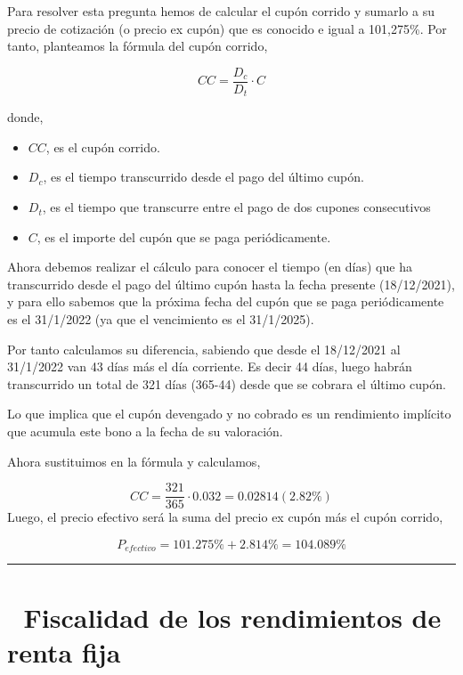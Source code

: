 \documentclass[
  letterpaper,
  DIV=11,
  numbers=noendperiod]{scrreprt}
\begin{document}
\begin{tcolorbox}
\begin{tcolorbox}[enhanced jigsaw, toprule=.15mm, left=2mm, arc=.35mm, breakable, bottomrule=.15mm, opacityback=0, rightrule=.15mm, leftrule=.75mm, colframe=quarto-callout-note-color-frame, colback=white]
\begin{minipage}[t]{\textwidth - 5.5mm}
Para resolver esta pregunta hemos de calcular el cupón corrido y sumarlo
a su precio de cotización (o precio ex cupón) que es conocido e igual a
101,275\%. Por tanto, planteamos la fórmula del cupón corrido,

\[CC=\frac{D_c}{D_t}\cdot C\]

donde,

\begin{itemize}
\item
  \(CC\), es el cupón corrido.
\item
  \(D_{c}\), es el tiempo transcurrido desde el pago del último cupón.
\item
  \(D_{t}\), es el tiempo que transcurre entre el pago de dos cupones
  consecutivos
\item
  \(C\), es el importe del cupón que se paga periódicamente.
\end{itemize}

Ahora debemos realizar el cálculo para conocer el tiempo (en días) que
ha transcurrido desde el pago del último cupón hasta la fecha presente
(18/12/2021), y para ello sabemos que la próxima fecha del cupón que se
paga periódicamente es el 31/1/2022 (ya que el vencimiento es el
31/1/2025).

Por tanto calculamos su diferencia, sabiendo que desde el 18/12/2021 al
31/1/2022 van 43 días más el día corriente. Es decir 44 días, luego
habrán transcurrido un total de 321 días (365-44) desde que se cobrara
el último cupón.

Lo que implica que el cupón devengado y no cobrado es un rendimiento
implícito que acumula este bono a la fecha de su valoración.

Ahora sustituimos en la fórmula y calculamos,

\[CC=\frac{321}{365}\cdot 0.032=0.02814(2.82\%)\] Luego, el precio
efectivo será la suma del precio ex cupón más el cupón corrido,

\[P_{efectivo}=101.275\%+2.814\%=104.089\%\]

\end{minipage}%
\end{tcolorbox}

\begin{center}\rule{0.5\linewidth}{0.5pt}\end{center}

\section{🧾 Fiscalidad de los rendimientos de renta
fija}\label{fiscalidad-de-los-rendimientos-de-renta-fija}


\end{tcolorbox}
\end{document}
